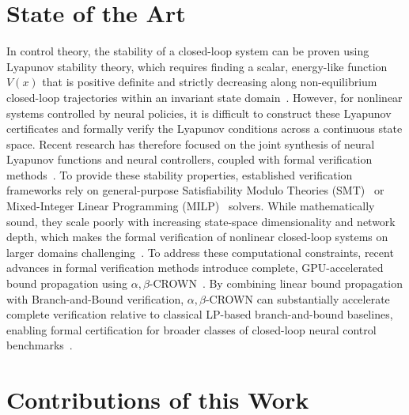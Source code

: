 \section*{State of the Art}
\label{sec:intro-sota}

In control theory, the stability of a closed-loop system can be proven using Lyapunov stability theory, which requires finding a scalar, 
energy-like function $V(x)$ that is positive definite and strictly decreasing along non-equilibrium closed-loop 
trajectories within an invariant state domain~\cite{gruneNonlinearModelPredictive2017,rawlingsModelPredictiveControl2020}. 
However, for nonlinear systems controlled by neural policies, it is difficult to construct these Lyapunov certificates and formally verify the 
Lyapunov conditions across a continuous state space. Recent research has therefore focused on the joint synthesis of neural Lyapunov
functions and neural controllers, coupled with formal verification
methods~\cite{yangLyapunovstableNeuralControl2024}.
To provide these stability properties, established verification frameworks rely on general-purpose Satisfiability Modulo Theories 
(SMT)~\cite{katzReluplexEfficientSMT2017} or Mixed-Integer Linear Programming (MILP)~\cite{tjengEvaluatingRobustnessNeural2019} solvers. 
While mathematically sound, they scale poorly with increasing state-space dimensionality and network depth, which 
makes the formal verification of nonlinear closed-loop systems on larger domains challenging~\cite{bunelUnifiedViewPiecewise2018,xuFastCompleteEnabling2021}.
To address these computational constraints, recent advances in formal verification methods introduce complete, GPU-accelerated bound propagation using 
$\alpha,\beta$-CROWN~\cite{wang2021beta,xuFastCompleteEnabling2021}. 
By combining linear bound propagation with Branch-and-Bound verification, $\alpha,\beta$-CROWN can substantially accelerate complete verification 
relative to classical LP-based branch-and-bound baselines, enabling formal certification for broader classes of closed-loop neural control 
benchmarks~\cite{yangLyapunovstableNeuralControl2024}.

\section*{Contributions of this Work}
\label{subsec:intro-contributions}

